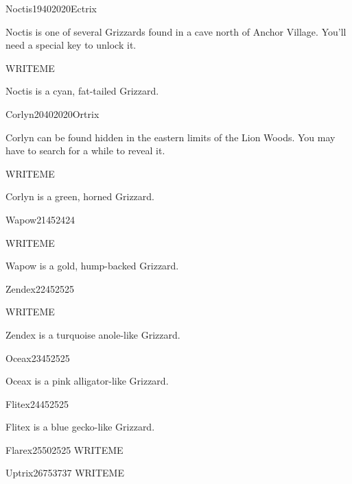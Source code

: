 \documentclass[10pt,twocolumn]{memoir}
\begin{document}
\begin{grizzardpage}{Noctis}{19}{40}{20}{20}{Ectrix}

  Noctis is  one of several  Grizzards found in  a cave north  of Anchor
  Village. You'll need a special key to unlock it.

WRITEME
  
  Noctis is a cyan, fat-tailed Grizzard.

\end{grizzardpage}

\begin{grizzardpage}{Corlyn}{20}{40}{20}{20}{Ortrix}

  Corlyn can  be found hidden in  the eastern limits of  the Lion Woods.
  You may have to search for a while to reveal it.

WRITEME
  
  Corlyn is a green, horned Grizzard.

\end{grizzardpage}

\begin{grizzardpage}{Wapow}{21}{45}{24}{24}{}

WRITEME

Wapow is a gold, hump-backed Grizzard.

\end{grizzardpage}

\begin{grizzardpage}{Zendex}{22}{45}{25}{25}{}

WRITEME
  
  Zendex is a turquoise anole-like Grizzard.

\end{grizzardpage}

\begin{grizzardpage}{Oceax}{23}{45}{25}{25}{}

  Oceax is a pink alligator-like Grizzard.

\end{grizzardpage}

\begin{grizzardpage}{Flitex}{24}{45}{25}{25}{}

Flitex is a blue gecko-like Grizzard.
  
\end{grizzardpage}

\begin{grizzardpage}{Flarex}{25}{50}{25}{25}{}
  WRITEME
\end{grizzardpage}

\begin{grizzardpage}{Uptrix}{26}{75}{37}{37}{}
  WRITEME
\end{grizzardpage}
\end{document}
